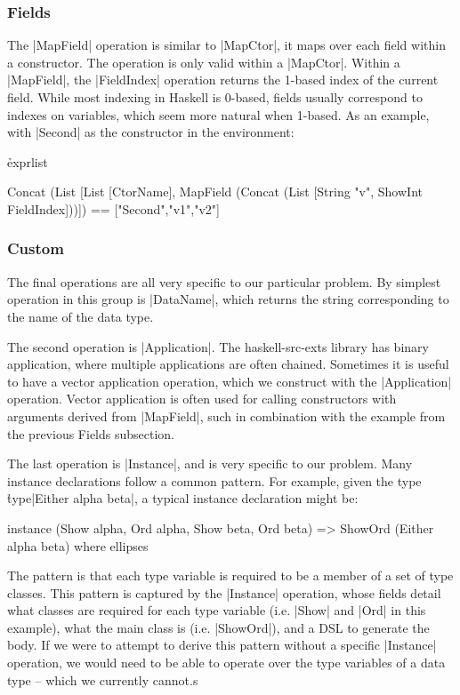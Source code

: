 \documentclass[preprint,draft]{sigplanconf}
\begin{document}
\subsubsection{Fields}

The |MapField| operation is similar to |MapCtor|, it maps over each field within a constructor. The operation is only valid within a |MapCtor|. Within a |MapField|, the |FieldIndex| operation returns the 1-based index of the current field. While most indexing in Haskell is 0-based, fields usually correspond to indexes on variables, which seem more natural when 1-based. As an example, with |Second| as the constructor in the environment:

\h{exprlist}\begin{code}
Concat (List [List [CtorName],
    MapField (Concat (List [String "v", ShowInt FieldIndex]))])
    == ["Second","v1","v2"]
\end{code}

\subsubsection{Custom}

The final operations are all very specific to our particular problem. By simplest operation in this group is |DataName|, which returns the string corresponding to the name of the data type.

The second operation is |Application|. The haskell-src-exts library has binary application, where multiple applications are often chained. Sometimes it is useful to have a vector application operation, which we construct with the |Application| operation. Vector application is often used for calling constructors with arguments derived from |MapField|, such in combination with the example from the previous Fields subsection.

The last operation is |Instance|, and is very specific to our problem. Many instance declarations follow a common pattern. For example, given the type \h{type}|Either alpha beta|, a typical instance declaration might be:

\ignore\begin{code}
instance (Show alpha, Ord alpha, Show beta, Ord beta) =>
    ShowOrd (Either alpha beta) where ellipses
\end{code}

The pattern is that each type variable is required to be a member of a set of type classes. This pattern is captured by the |Instance| operation, whose fields detail what classes are required for each type variable (i.e. |Show| and |Ord| in this example), what the main class is (i.e. |ShowOrd|), and a DSL to generate the body. If we were to attempt to derive this pattern without a specific |Instance| operation, we would need to be able to operate over the type variables of a data type -- which we currently cannot.s
\end{document}

